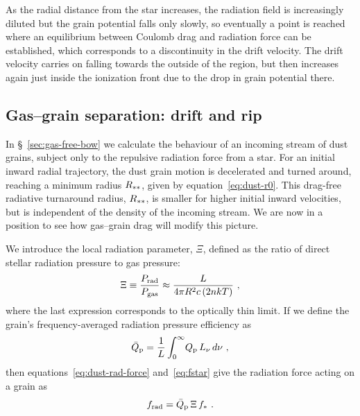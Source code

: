 As the radial distance from the star increases, the radiation field is
increasingly diluted but the grain potential falls only slowly, so
eventually a point is reached where an equilibrium between Coulomb
drag and radiation force can be established, which corresponds to a
discontinuity in the drift velocity.  The drift velocity carries
on falling towards the outside of the \hii{} region, but then
increases again just inside the ionization front due to the drop in
grain potential there.

\subsection{Gas--grain separation: drift and rip}
\label{sec:gas-grain-separ}

In \S~\ref{sec:gas-free-bow} we calculate the behaviour of an
incoming stream of dust grains, subject only to the repulsive
radiation force from a star.  For an initial inward radial trajectory,
the dust grain motion is decelerated and turned around, reaching a
minimum radius \(R_{**}\), given by equation~\eqref{eq:dust-r0}.
This drag-free radiative turnaround radius, \(R_{**}\), is smaller
for higher initial inward velocities, but is independent of the
density of the incoming stream.  We are now in a position to see how
gas--grain drag will modify this picture.

We introduce the local radiation parameter, \(\Xi\), defined as the
ratio of direct stellar radiation pressure to gas pressure:
\begin{equation}
  \label{eq:Xi-Prad-over-Pgas}
  \Xi \equiv \frac{P_{\text{rad}}}{P_{\text{gas}}} \approx \frac{L}{4 \pi R^2 c\, (2 n k T)} \ ,
\end{equation}
where the last expression corresponds to the optically thin limit.  If
we define the grain's frequency-averaged radiation pressure efficiency
as
\begin{equation}
  \label{eq:Qpbar}
  \bar{Q}_{\text{p}} = \frac{1}{L} \int_0^\infty \!Q_{\text{p}} \, L_\nu \, d\nu \ ,
\end{equation}
then equations~\eqref{eq:dust-rad-force} and~\eqref{eq:fstar} give the
radiation force acting on a grain as
\begin{equation}
  \label{eq:frad-Xi}
  f_{\text{rad}} = \bar{Q}_{\text{p}}\, \Xi\, f_* \ .
\end{equation}

